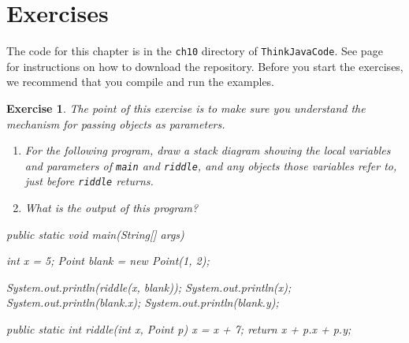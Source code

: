 \documentclass[12pt]{book}
\theoremstyle{exercise}
\newtheorem{exercise}{Exercise}[chapter]
\newcommand{\java}[1]{\verb"#1"}
\begin{document}
\section{Exercises}

The code for this chapter is in the {\tt ch10} directory of {\tt ThinkJavaCode}.
See page~\pageref{code} for instructions on how to download the repository.
Before you start the exercises, we recommend that you compile and run the examples.

\begin{exercise}
The point of this exercise is to make sure you understand the mechanism for passing objects as parameters.

\begin{enumerate}

\item For the following program, draw a stack diagram showing the local variables and parameters of \java{main} and \java{riddle}, and any objects those variables refer to, just before \java{riddle} returns.

\item What is the output of this program?

\end{enumerate}

\begin{code}
    public static void main(String[] args) {
        int x = 5;
        Point blank = new Point(1, 2);

        System.out.println(riddle(x, blank));
        System.out.println(x);
        System.out.println(blank.x);
        System.out.println(blank.y);
    }

    public static int riddle(int x, Point p) {
        x = x + 7;
        return x + p.x + p.y;
    }
\end{code}

\end{exercise}
\end{document}
